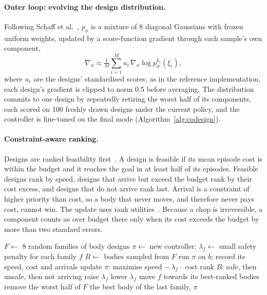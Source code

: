 \documentclass[sigconf,review]{acmart}
\begin{document}
\paragraph{Outer loop: evolving the design distribution.} Following Schaff et al.~\cite{schaff2019jointly}, $p_\phi$ is a mixture of 8 diagonal Gaussians with frozen uniform weights, updated by a score-function gradient through each sample's own component,
\begin{equation}
\nabla_\phi \approx \tfrac{1}{M}\textstyle\sum_{i=1}^{M} u_i\,\nabla_\phi \log p_\phi^{k_i}(\xi_i),
\end{equation}
where $u_i$ are the designs' standardised scores; as in the reference implementation, each design's gradient is clipped to norm 0.5 before averaging. The distribution commits to one design by repeatedly retiring the worst half of its components, each scored on 100 freshly drawn designs under the current policy, and the controller is fine-tuned on the final mode (Algorithm~\ref{alg:codesign}).

\paragraph{Constraint-aware ranking.} Designs are ranked feasibility first~\cite{deb2000efficient}. A design is feasible if its mean episode cost is within the budget and it reaches the goal in at least half of its episodes. Feasible designs rank by speed, designs that arrive but exceed the budget rank by their cost excess, and designs that do not arrive rank last. Arrival is a constraint of higher priority than cost, so a body that never moves, and therefore never pays cost, cannot win. The update uses rank utilities~\cite{wierstra2014natural}. Because a chop is irreversible, a component counts as over budget there only when its cost exceeds the budget by more than two standard errors.

\begin{algorithm}[t]
\caption{Constrained co-design}
\label{alg:codesign}
\small
\begin{algorithmic}[1]
\State $F \gets$ 8 random families of body designs
\State $\pi \gets$ new controller; \; $\lambda_f \gets$ small safety penalty for each family $f$
  \State $B \gets$ bodies sampled from $F$
    \State run $\pi$ on $b$; record its speed, cost and arrivals
  \EndFor
  \State update $\pi$: maximise speed $-\,\lambda_f \cdot$ cost
  \State rank $B$: safe, then unsafe, then not arriving
      \State raise $\lambda_f$
    \Else
      \State lower $\lambda_f$
    \EndIf
    \State move $f$ towards its best-ranked bodies
  \EndFor
    \State remove the worst half of $F$
  \EndIf
\EndFor
\State \Return the best body of the last family, $\pi$
\end{algorithmic}
\end{algorithm}
\end{document}
